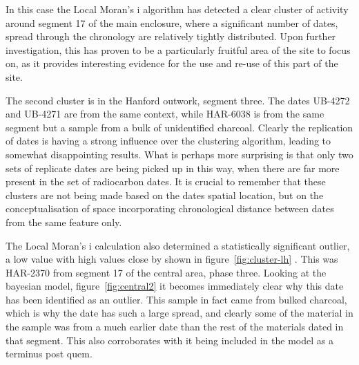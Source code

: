 In this case the Local Moran's i algorithm has detected a clear cluster of activity around segment 17 of the main enclosure, where a significant number of dates, spread through the chronology are relatively tightly distributed. Upon further investigation, this has proven to be a particularly fruitful area of the site to focus on, as it provides interesting evidence for the use and re-use of this part of the site.

The second cluster is in the Hanford outwork, segment three. The dates UB-4272 and UB-4271 are from the same context, while HAR-6038 is from the same segment but a sample from a bulk of unidentified charcoal. Clearly the replication of dates is having a strong influence over the clustering algorithm, leading to somewhat disappointing results. What is perhaps more surprising is that only two sets of replicate dates are being picked up in this way, when there are far more present in the set of radiocarbon dates. It is crucial to remember that these clusters are not being made based on the dates spatial location, but on the conceptualisation of space incorporating chronological distance between dates from the same feature only.

The Local Moran's i calculation also determined a statistically significant outlier, a low value with high values close by shown in figure~\ref{fig:cluster-lh} . This was HAR-2370 from segment 17 of the central area, phase three. Looking at the bayesian model, figure~\ref{fig:central2} it becomes immediately clear why this date has been identified as an outlier. This sample in fact came from bulked charcoal, which is why the date has such a large spread, and clearly some of the material in the sample was from a much earlier date than the rest of the materials dated in that segment. This also corroborates with it being included in the model as a terminus post quem.

